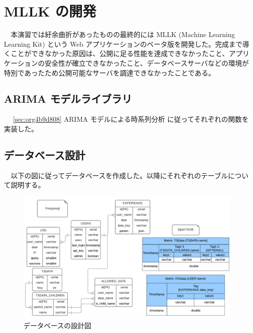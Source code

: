 \documentclass{scrartcl}
\begin{document}
\section{MLLK の開発}
\label{sec:orgf8de349}
　本演習では紆余曲折があったものの最終的には MLLK (Machine Learning Learning Kit) という Web アプリケーションのベータ版を開発した。完成まで導くことができなかった原因は、公開に足る性能を達成できなかったこと、アプリケーションの安全性が確立できなかったこと、データベースサーバなどの環境が特別であったため公開可能なサーバを調達できなかったことである。\\
\subsection{ARIMA モデルライブラリ}
\label{sec:org052dc88}
　 \ref{sec:org4b9d808} ARIMA モデルによる時系列分析 に従ってそれぞれの関数を実装した。\\
\subsection{データベース設計}
\label{sec:org02746a1}
　以下の図に従ってデータベースを作成した。以降にそれぞれのテーブルについて説明する。\\
\begin{figure}[htbp]
\centering
\includegraphics[width=15cm]{./fool-diagram.png}
\caption{データベースの設計図}
\end{figure}
\end{document}
